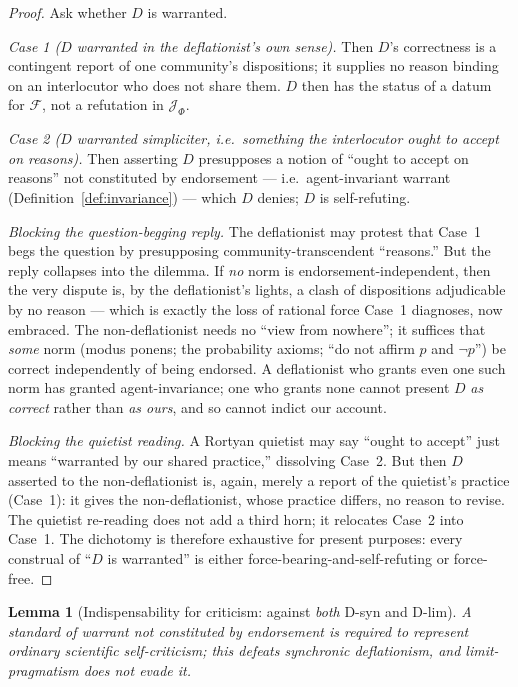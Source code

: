 \documentclass{amsart}
\theoremstyle{definition}
\theoremstyle{plain}
\newtheorem{lemma}{Lemma}
\theoremstyle{remark}
\begin{document}
\begin{proof}
Ask whether $D$ is warranted.

\emph{Case 1 ($D$ warranted in the deflationist's own sense).} Then $D$'s
correctness is a contingent report of one community's dispositions; it supplies
no reason binding on an interlocutor who does not share them. $D$ then has the
status of a datum for $\mathcal{F}$, not a refutation in $\mathcal{J}_\Phi$.

\emph{Case 2 ($D$ warranted simpliciter, i.e.\ something the interlocutor ought
to accept on reasons).} Then asserting $D$ presupposes a notion of ``ought to
accept on reasons'' not constituted by endorsement --- i.e.\
agent-invariant warrant (Definition~\ref{def:invariance}) --- which $D$ denies;
$D$ is self-refuting.

\emph{Blocking the question-begging reply.} The deflationist may protest that
Case~1 begs the question by presupposing community-transcendent ``reasons.''
But the reply collapses into the dilemma. If \emph{no} norm is
endorsement-independent, then the very dispute is, by the deflationist's lights,
a clash of dispositions adjudicable by no reason --- which is exactly the loss
of rational force Case~1 diagnoses, now embraced. The non-deflationist needs no
``view from nowhere''; it suffices that \emph{some} norm (modus ponens; the
probability axioms; ``do not affirm $p$ and $\neg p$'') be correct
independently of being endorsed. A deflationist who grants even one such norm
has granted agent-invariance; one who grants none cannot present $D$ \emph{as
correct} rather than \emph{as ours}, and so cannot indict our account.

\emph{Blocking the quietist reading.} A Rortyan quietist may say ``ought to
accept'' just means ``warranted by our shared practice,'' dissolving Case~2.
But then $D$ asserted to the non-deflationist is, again, merely a report of the
quietist's practice (Case~1): it gives the non-deflationist, whose practice
differs, no reason to revise. The quietist re-reading does not add a third
horn; it relocates Case~2 into Case~1. The dichotomy is therefore exhaustive
for present purposes: every construal of ``$D$ is warranted'' is either
force-bearing-and-self-refuting or force-free.
\end{proof}

\begin{lemma}[Indispensability for criticism: against \emph{both} D-syn and
D-lim]\label{lem:criticism}
A standard of warrant not constituted by endorsement is required to represent
ordinary scientific self-criticism; this defeats synchronic deflationism, and
limit-pragmatism does not evade it.
\end{lemma}
\end{document}
